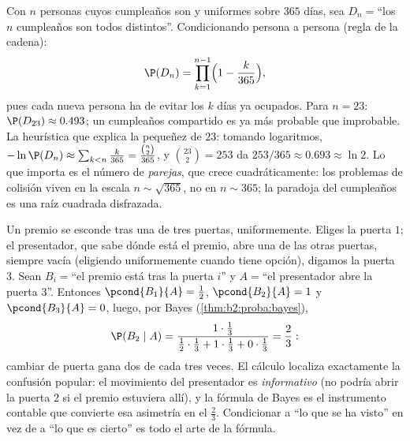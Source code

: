 \begin{example}\label{ex:b2:proba:birthday}
Con $n$ personas cuyos cumpleaños son  y uniformes sobre
$365$ días, sea $D_n = {}$``los $n$ cumpleaños son todos distintos''.
Condicionando persona a persona (regla de la cadena):
\[
\P(D_n) = \prod_{k=1}^{n-1}\Bigl(1 - \frac{k}{365}\Bigr),
\]
pues cada nueva persona ha de evitar los $k$ días ya ocupados. Para
$n = 23$: $\P(D_{23}) \approx 0.493$; un cumpleaños compartido es ya
más probable que improbable. La heurística que explica la pequeñez de
$23$: tomando logaritmos, $-\ln \P(D_n) \approx \sum_{k<n}\frac
k{365} = \frac{\binom n2}{365}$, y $\binom{23}2 = 253$ da $253/365
\approx 0.693 \approx \ln 2$. Lo que importa es el número de
\emph{parejas}, que crece cuadráticamente: los problemas de colisión
viven en la escala $n \sim \sqrt{365}$, no en $n \sim 365$; la
paradoja del cumpleaños es una raíz cuadrada disfrazada.
\end{example}

\begin{example}\label{ex:b2:proba:montyhall}
Un premio se esconde tras una de tres puertas, uniformemente. Eliges
la puerta $1$; el presentador, que sabe dónde está el premio, abre
una de las otras puertas, siempre vacía (eligiendo uniformemente
cuando tiene opción), digamos la puerta $3$. Sean $B_i = {}$``el
premio está tras la puerta $i$'' y $A = {}$``el presentador abre la
puerta $3$''. Entonces $\pcond{B_1}{A} = \frac12$, $\pcond{B_2}{A} =
1$ y $\pcond{B_3}{A} = 0$, luego, por Bayes
(\cref{thm:b2:proba:bayes}),
\[
\P(B_2 \mid A)
= \frac{1\cdot\frac13}
{\frac12\cdot\frac13 + 1\cdot\frac13 + 0\cdot\frac13}
= \frac23 :
\]
cambiar de puerta gana dos de cada tres veces. El cálculo localiza
exactamente la confusión popular: el movimiento del presentador es
\emph{informativo} (no podría abrir la puerta $2$ si el premio
estuviera allí), y la fórmula de Bayes es el instrumento contable que
convierte esa asimetría en el $\frac23$. Condicionar a ``lo que se ha
visto'' en vez de a ``lo que es cierto'' es todo el arte de la
fórmula.
\end{example}

